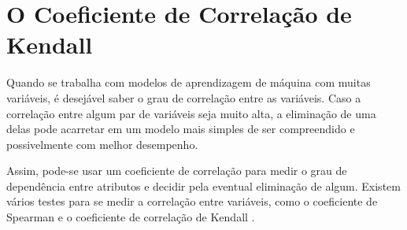 \section{O Coeficiente de Correlação de Kendall}
Quando se trabalha com modelos de aprendizagem de máquina com muitas variáveis, é
desejável saber o grau de correlação entre as variáveis. Caso a correlação entre
algum par de variáveis seja muito alta, a eliminação de uma delas pode acarretar em
um modelo mais simples de ser compreendido e possivelmente com melhor desempenho.
\par Assim, pode-se usar um coeficiente de correlação para medir o grau de dependência
entre atributos e decidir pela eventual eliminação de algum. Existem vários testes
para se medir a correlação entre variáveis, como o coeficiente de Spearman e o
coeficiente de correlação de Kendall \cite{kendall}. 

